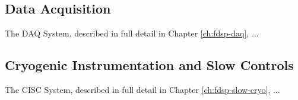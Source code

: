 \subsection{Data Acquisition}
\label{sec:fdsp-ov-daq}

The DAQ System, described in full detail in Chapter \ref{ch:fdsp-daq}, ...
\subsection{Cryogenic Instrumentation and Slow Controls}
\label{sec:fdsp-ov-instr}

The CISC System, described in full detail in Chapter \ref{ch:fdsp-slow-cryo}, ...






